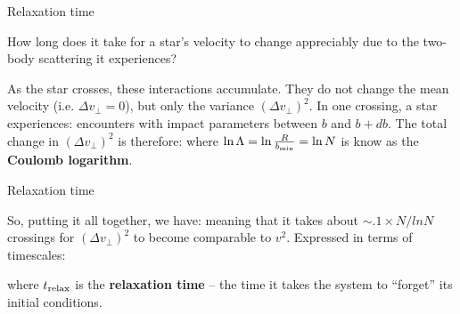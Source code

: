 \documentclass[letterpaper,landscape]{slides}
\begin{document}
\begin{slide}
\begin{center}
{\large \color{red} Relaxation time }
\end{center}

How long does it take for a star's velocity to change appreciably due to the
two-body scattering it experiences?

As the star crosses, these interactions accumulate. They do not change the
mean velocity (i.e. $\Delta v_\perp = 0$), but only the variance $(\Delta
v_\perp)^2$. In one crossing, a star experiences:
encounters with impact parameters between $b$ and $b + db$. The total change
in $(\Delta v_\perp)^2$ is therefore:
where $\ln \Lambda = \ln {R \over b_{\rm min}} = \ln N$ is know as the {\bf Coulomb logarithm}.

\vfill
\end{slide}


\begin{slide}
\begin{center}
{\large \color{red} Relaxation time }
\end{center}

So, putting it all together, we have:
meaning that it takes about $\sim .1 \times N / ln N$ crossings for $(\Delta
v_\perp)^2$ to become comparable to $v^2$. Expressed in terms of timescales:


where $t_{\rm relax}$ is the {\bf relaxation time} -- the time it takes the
system to ``forget'' its initial conditions.

\vfill
\end{slide}
\end{document}
